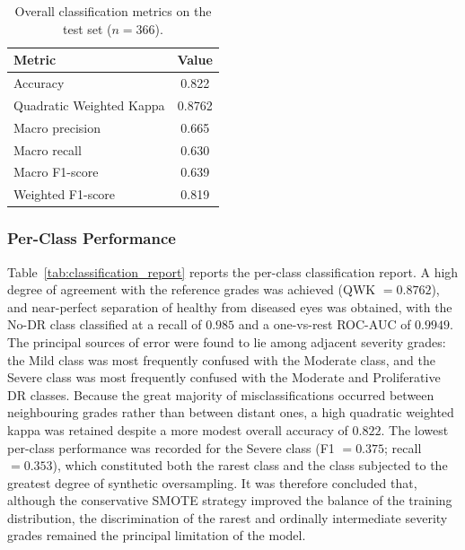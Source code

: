 \begin{table}[H]
\centering
\caption{Overall classification metrics on the test set ($n=366$).}
\label{tab:overall_metrics}
\begin{tabular}{lc}
\toprule
Metric & Value \\
\midrule
Accuracy                   & 0.822 \\
Quadratic Weighted Kappa   & 0.8762 \\
Macro precision            & 0.665 \\
Macro recall               & 0.630 \\
Macro F1-score             & 0.639 \\
Weighted F1-score          & 0.819 \\
\bottomrule
\end{tabular}
\end{table}

\subsubsection{Per-Class Performance}
\label{subsubsec:perclass_performance}

Table~\ref{tab:classification_report} reports the per-class classification report.
A high degree of agreement with the reference grades was achieved (QWK $= 0.8762$),
and near-perfect separation of healthy from diseased eyes was obtained, with the
No-DR class classified at a recall of $0.985$ and a one-vs-rest ROC-AUC of $0.9949$.
The principal sources of error were found to lie among adjacent severity grades: the
Mild class was most frequently confused with the Moderate class, and the Severe class
was most frequently confused with the Moderate and Proliferative DR classes. Because
the great majority of misclassifications occurred between neighbouring grades rather
than between distant ones, a high quadratic weighted kappa was retained despite a
more modest overall accuracy of $0.822$. The lowest per-class performance was
recorded for the Severe class (F1 $= 0.375$; recall $= 0.353$), which constituted
both the rarest class and the class subjected to the greatest degree of synthetic
oversampling. It was therefore concluded that, although the conservative SMOTE
strategy improved the balance of the training distribution, the discrimination of
the rarest and ordinally intermediate severity grades remained the principal
limitation of the model.

